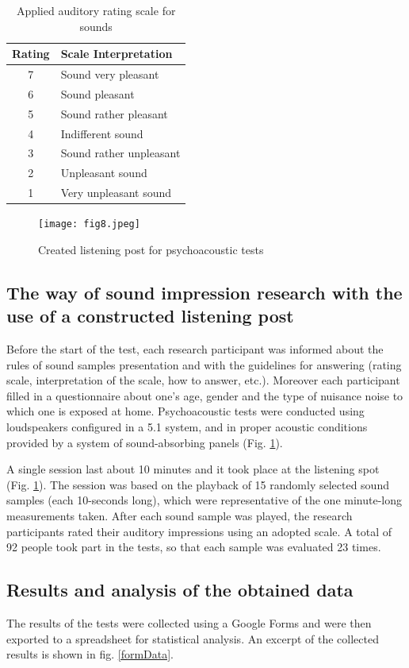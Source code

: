 \documentclass[a4paper,10pt]{article}
\begin{document}
\begin{table}[H]
  \begin{tabular}{|c|l|}
    \hline
    \textbf{Rating}   & \textbf{Scale Interpretation} \\ \hline\hline
    7   & Sound very pleasant \\ \hline
    6   & Sound pleasant \\ \hline
    5   & Sound rather pleasant \\ \hline
    4   & Indifferent sound \\ \hline
    3   & Sound rather unpleasant \\ \hline
    2   & Unpleasant sound \\ \hline
    1   & Very unpleasant sound \\ \hline
  \end{tabular}
  \centering
  \caption{Applied auditory rating scale for sounds}
\end{table}

\begin{figure}[H]
  \texttt{[image: fig8.jpeg]}
  \centering
  \caption{Created listening post for psychoacoustic tests}
  \label{testSetup}
\end{figure}


\begin{multicols}{2}
\subsection*{The way of sound impression research with the use of a constructed
  listening post}
  Before the start of the test, each research participant was informed about the
  rules of sound samples presentation and with the guidelines for answering
  (rating scale, interpretation of the scale, how to answer, etc.). Moreover
  each participant filled in a questionnaire about one's age, gender and the
  type of nuisance noise to which one is exposed at home. Psychoacoustic tests
  were conducted using loudspeakers configured in a 5.1 system, and in proper
  acoustic conditions provided by a system of sound-absorbing panels (Fig.
  \ref{testSetup}).

  A single session last about 10 minutes and it took place at the listening spot
  (Fig. \ref{testSetup}). The session was based on the playback of 15 randomly
  selected sound samples (each 10-seconds long), which were representative of
  the one minute-long measurements taken. After each sound sample was played,
  the research participants rated their auditory impressions using an adopted
  scale. A total of 92 people took part in the tests, so that each sample was
  evaluated 23 times.

  \subsection*{Results and analysis of the obtained data}

  The results of the tests were collected using a Google Forms and were then
  exported to a spreadsheet for statistical analysis. An excerpt of the
  collected results is shown in fig. \ref{formData}.

\end{multicols}
\end{document}
